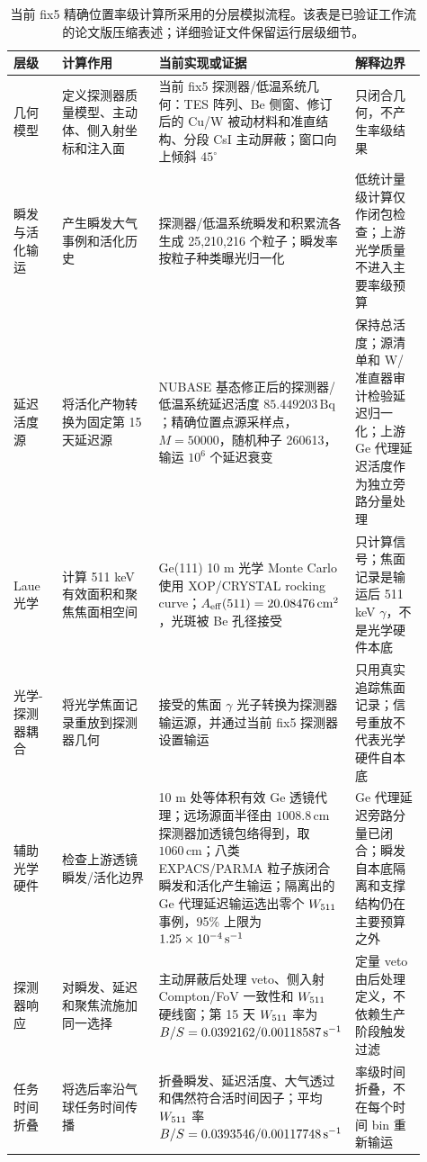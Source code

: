 \begin{table}[t]
\centering
\caption{当前 fix5 精确位置率级计算所采用的分层模拟流程。该表是已验证工作流的论文版压缩表述；详细验证文件保留运行层级细节。}
\label{tab:simulation_workflow}
\begingroup
\setlength{\tabcolsep}{2pt}
\renewcommand{\arraystretch}{0.78}
\tiny
\begin{tabular}{@{}p{0.12\linewidth}p{0.25\linewidth}p{0.36\linewidth}p{0.18\linewidth}@{}}
\toprule
层级 & 计算作用 & 当前实现或证据 & 解释边界 \\
\midrule
几何模型 & 定义探测器质量模型、主动体、侧入射坐标和注入面 & 当前 fix5 探测器/低温系统几何：TES 阵列、Be 侧窗、修订后的 Cu/W 被动材料和准直结构、分段 CsI 主动屏蔽；窗口向上倾斜 $45^\circ$ & 只闭合几何，不产生率级结果 \\
瞬发与活化输运 & 产生瞬发大气事例和活化历史 & 探测器/低温系统瞬发和积累流各生成 25,210,216 个粒子；瞬发率按粒子种类曝光归一化 & 低统计量级计算仅作闭包检查；上游光学质量不进入主要率级预算 \\
延迟活度源 & 将活化产物转换为固定第 15 天延迟源 & NUBASE 基态修正后的探测器/低温系统延迟活度 $85.449203\,\mathrm{Bq}$；精确位置点源采样点，$M=50000$，随机种子 260613，输运 $10^6$ 个延迟衰变 & 保持总活度；源清单和 W/准直器审计检验延迟归一化；上游 Ge 代理延迟活度作为独立旁路分量处理 \\
Laue 光学 & 计算 511 keV 有效面积和聚焦焦面相空间 & Ge(111) 10 m 光学 Monte Carlo 使用 XOP/CRYSTAL rocking curve；$A_{\mathrm{eff}}(511)=20.08476\,\mathrm{cm^2}$，光斑被 Be 孔径接受 & 只计算信号；焦面记录是输运后 511 keV $\gamma$，不是光学硬件本底 \\
光学-探测器耦合 & 将光学焦面记录重放到探测器几何 & 接受的焦面 $\gamma$ 光子转换为探测器输运源，并通过当前 fix5 探测器设置输运 & 只用真实追踪焦面记录；信号重放不代表光学硬件自本底 \\
辅助光学硬件 & 检查上游透镜瞬发/活化边界 & 10 m 处等体积有效 Ge 透镜代理；远场源面半径由 $1008.8\,\mathrm{cm}$ 探测器加透镜包络得到，取 $1060\,\mathrm{cm}$；八类 EXPACS/PARMA 粒子族闭合瞬发和活化产生输运；隔离出的 Ge 代理延迟输运选出零个 $W_{511}$ 事例，95\% 上限为 $1.25\times10^{-4}\,\mathrm{s^{-1}}$ & Ge 代理延迟旁路分量已闭合；瞬发自本底隔离和支撑结构仍在主要预算之外 \\
探测器响应 & 对瞬发、延迟和聚焦流施加同一选择 & 主动屏蔽后处理 veto、侧入射 Compton/FoV 一致性和 $W_{511}$ 硬线窗；第 15 天 $W_{511}$ 率为 $B/S=0.0392162/0.00118587\,\mathrm{s^{-1}}$ & 定量 veto 由后处理定义，不依赖生产阶段触发过滤 \\
任务时间折叠 & 将选后率沿气球任务时间传播 & 折叠瞬发、延迟活度、大气透过和偶然符合活时间因子；平均 $W_{511}$ 率 $B/S=0.0393546/0.00117748\,\mathrm{s^{-1}}$ & 率级时间折叠，不在每个时间 bin 重新输运 \\

\end{tabular}
\end{table}
